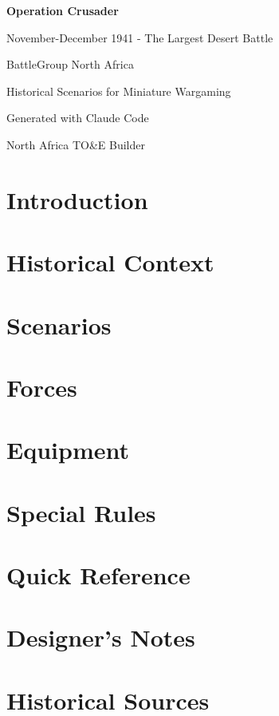 \documentclass[11pt,letterpaper,twoside]{book}
\begin{document}
\begin{titlepage}
    \centering
    \vspace*{2cm}
    {\Huge\bfseries Operation Crusader\par}
    \vspace{1cm}
    {\Large November-December 1941 - The Largest Desert Battle\par}
    \vspace{2cm}
    {\Large BattleGroup North Africa\par}
    {\large Historical Scenarios for Miniature Wargaming\par}
    \vfill
    {\large Generated with Claude Code\par}
    {\large North Africa TO&E Builder\par}
    \vspace{1cm}
\end{titlepage}

\tableofcontents


\chapter{Introduction}

\chapter{Historical Context}

\chapter{Scenarios}

\chapter{Forces}

\chapter{Equipment}

\chapter{Special Rules}

\appendix
\chapter{Quick Reference}

\chapter{Designer's Notes}

\chapter{Historical Sources}
\end{document}
